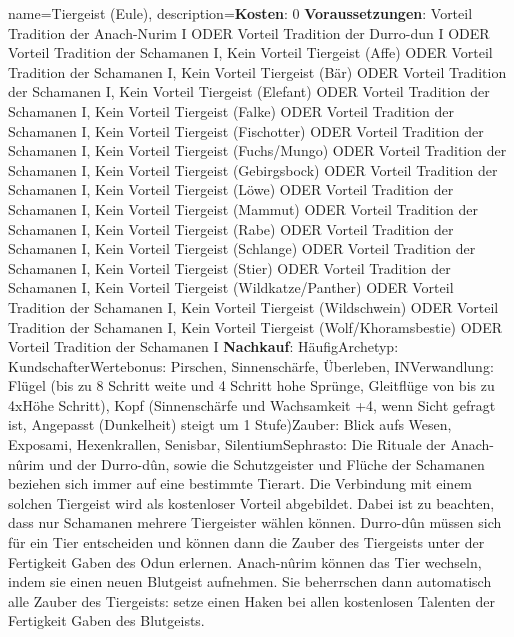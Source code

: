 {
    name={Tiergeist (Eule)},
    description={\textbf{Kosten}: 0 \textbf{Voraussetzungen}: Vorteil Tradition der Anach-Nurim I ODER Vorteil Tradition der Durro-dun I ODER Vorteil Tradition der Schamanen I, Kein Vorteil Tiergeist (Affe) ODER Vorteil Tradition der Schamanen I, Kein Vorteil Tiergeist (Bär) ODER Vorteil Tradition der Schamanen I, Kein Vorteil Tiergeist (Elefant) ODER Vorteil Tradition der Schamanen I, Kein Vorteil Tiergeist (Falke) ODER Vorteil Tradition der Schamanen I, Kein Vorteil Tiergeist (Fischotter) ODER Vorteil Tradition der Schamanen I, Kein Vorteil Tiergeist (Fuchs/Mungo) ODER Vorteil Tradition der Schamanen I, Kein Vorteil Tiergeist (Gebirgsbock) ODER Vorteil Tradition der Schamanen I, Kein Vorteil Tiergeist (Löwe) ODER Vorteil Tradition der Schamanen I, Kein Vorteil Tiergeist (Mammut) ODER Vorteil Tradition der Schamanen I, Kein Vorteil Tiergeist (Rabe) ODER Vorteil Tradition der Schamanen I, Kein Vorteil Tiergeist (Schlange) ODER Vorteil Tradition der Schamanen I, Kein Vorteil Tiergeist (Stier) ODER Vorteil Tradition der Schamanen I, Kein Vorteil Tiergeist (Wildkatze/Panther) ODER Vorteil Tradition der Schamanen I, Kein Vorteil Tiergeist (Wildschwein) ODER Vorteil Tradition der Schamanen I, Kein Vorteil Tiergeist (Wolf/Khoramsbestie) ODER Vorteil Tradition der Schamanen I \textbf{Nachkauf}: Häufig\newline Archetyp: Kundschafter\newline Wertebonus: Pirschen, Sinnenschärfe, Überleben, IN\newline Verwandlung: Flügel (bis zu 8 Schritt weite und 4 Schritt hohe Sprünge, Gleitflüge von bis zu 4xHöhe Schritt), Kopf (Sinnenschärfe und Wachsamkeit +4, wenn Sicht gefragt ist, Angepasst (Dunkelheit) steigt um 1 Stufe)\newline Zauber: Blick aufs Wesen, Exposami, Hexenkrallen, Senisbar, Silentium\newline Sephrasto: Die Rituale der Anach-nûrim und der Durro-dûn, sowie die Schutzgeister und Flüche der Schamanen beziehen sich immer auf eine bestimmte Tierart. Die Verbindung mit einem solchen Tiergeist wird als kostenloser Vorteil abgebildet. Dabei ist zu beachten, dass nur Schamanen mehrere Tiergeister wählen können. Durro-dûn müssen sich für ein Tier entscheiden und können dann die Zauber des Tiergeists unter der Fertigkeit Gaben des Odun erlernen. Anach-nûrim können das Tier wechseln, indem sie einen neuen Blutgeist aufnehmen. Sie beherrschen dann automatisch alle Zauber des Tiergeists: setze einen Haken bei allen kostenlosen Talenten der Fertigkeit Gaben des Blutgeists.}
}


